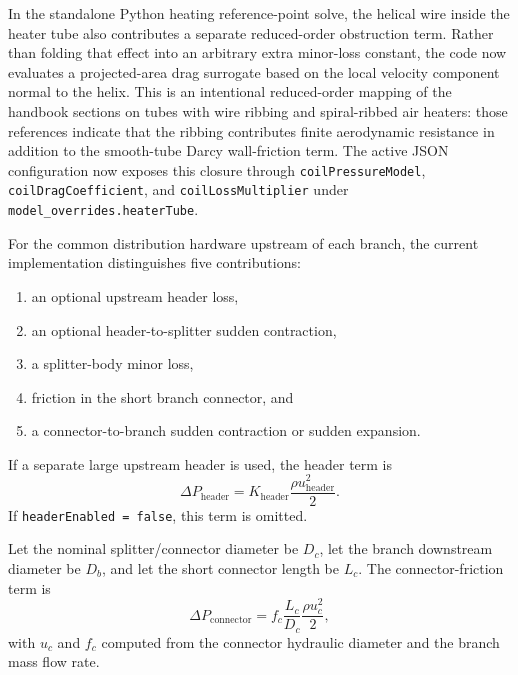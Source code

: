 \documentclass{article}
\begin{document}
In the standalone Python heating reference-point solve, the helical wire inside
the heater tube also contributes a separate reduced-order obstruction term.
Rather than folding that effect into an arbitrary extra minor-loss constant, the
code now evaluates a projected-area drag surrogate based on the local velocity
component normal to the helix. This is an intentional reduced-order mapping of
the handbook sections on tubes with wire ribbing and spiral-ribbed air heaters:
those references indicate that the ribbing contributes finite aerodynamic
resistance in addition to the smooth-tube Darcy wall-friction term. The active
JSON configuration now exposes this closure through
\texttt{coilPressureModel}, \texttt{coilDragCoefficient}, and
\texttt{coilLossMultiplier} under \texttt{model\_overrides.heaterTube}.

For the common distribution hardware upstream of each branch, the current
implementation distinguishes five contributions:
\begin{enumerate}
\item an optional upstream header loss,
\item an optional header-to-splitter sudden contraction,
\item a splitter-body minor loss,
\item friction in the short branch connector, and
\item a connector-to-branch sudden contraction or sudden expansion.
\end{enumerate}

If a separate large upstream header is used, the header term is
\begin{equation}
\Delta P_{\mathrm{header}}
= K_{\mathrm{header}} \frac{\rho u_{\mathrm{header}}^2}{2}.
\end{equation}
If \texttt{headerEnabled = false}, this term is omitted.

Let the nominal splitter/connector diameter be $D_c$, let the branch
downstream diameter be $D_b$, and let the short connector length be
$L_c$. The connector-friction term is
\begin{equation}
\Delta P_{\mathrm{connector}}
= f_c \frac{L_c}{D_c}\frac{\rho u_c^2}{2},
\end{equation}
with $u_c$ and $f_c$ computed from the connector hydraulic diameter and the
branch mass flow rate.
\end{document}
